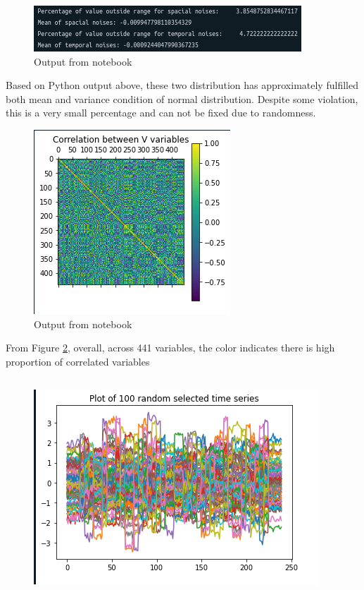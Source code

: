 \documentclass{article}
\begin{document}
\begin{figure}[H]
    \centering
    \includegraphics[]{1.4 output.png}
    \caption{Output from notebook}
    \label{fig:corr tm}
\end{figure}

Based on Python output above, these two distribution has approximately fulfilled both mean and variance condition of normal distribution. Despite some violation, this is a very small percentage and can not be fixed due to randomness.

\begin{figure}[H]
    \centering
    \includegraphics[]{corr V var.png}
    \caption{Output from notebook}
    \label{fig:corr V var}
\end{figure}
From Figure \ref{fig:corr V var}, overall, across 441 variables, the color indicates there is high proportion of correlated variables

\subsection{}
\begin{figure}[H]
    \centering
    \includegraphics[]{100 temp.png}
    \label{fig:hist var}
\end{figure}
\end{document}
